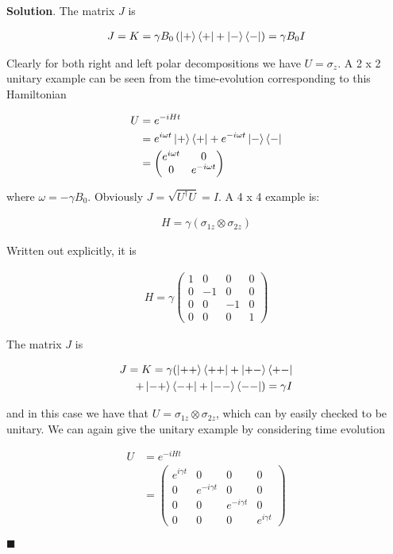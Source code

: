 \documentclass[12pt]{article}
\theoremstyle{definition}
\newenvironment{s}{%
        \begin{trivlist} \item \textbf{Solution}. }{%
            \hspace*{\fill} $\blacksquare$\end{trivlist}}%
\begin{document}
{\begin{s}
The matrix $J$ is

\begin{align*}
J = K = \gamma B_{0} \left(\ket{+}\bra{+} + \ket{-}\bra{-}\right) = \gamma B_{0}I
\end{align*}

Clearly for both right and left polar decompositions we have $U = \sigma_{z}$. A 2 x 2 unitary example can be seen from the time-evolution corresponding to this Hamiltonian 


\begin{align*}
U &= e^{-iHt} \\
&= e^{i\omega t}\ket{+}\bra{+} + e^{-i\omega t}\ket{-}\bra{-}\\
&= \begin{pmatrix}e^{i\omega t} & 0 \\ 0 & e^{-i\omega t}\end{pmatrix}
\end{align*}

where $\omega = -\gamma B_{0}$. Obviously $J = \sqrt{U^{\dagger}U} = I$.  A 4 x 4 example is:

\begin{align*}
H = \gamma \left(\sigma_{1z}\otimes\sigma_{2z}\right)
\end{align*}

Written out explicitly, it is

\begin{align*}
H = 
\gamma \begin{pmatrix}
1 & 0 & 0 & 0\\
0 & -1 & 0 & 0\\
0 & 0 & -1 & 0\\
0 & 0 & 0 & 1
\end{pmatrix}
\end{align*}

The matrix $J$ is

\begin{align*}
J = K = \gamma (\ket{++}\bra{++} + \ket{+-}\bra{+-} \\
+ \ket{-+}\bra{-+} + \ket{--}\bra{--}) = \gamma I
\end{align*}

and in this case we have that $U = \sigma_{1z}\otimes\sigma_{2z}$, which can by easily checked to be unitary. We can again give the unitary example by considering time evolution

\begin{align*}
U &= e^{-iHt}\\
 &= \begin{pmatrix}
e^{i\gamma t} & 0 & 0 & 0\\
0 & e^{-i\gamma t} & 0 & 0\\
0 & 0 & e^{-i\gamma t} & 0\\
0 & 0 & 0 & e^{i\gamma t}
\end{pmatrix}
\end{align*}


\end{s}}
\end{document}
